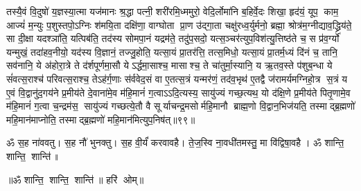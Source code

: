 तस्यै॒वं  वि॒दुषो॑ य॒ज्ञस्या॒त्मा यज॑मानः श्र॒द्धा पत्नी॒ शरी॑रमि॒ध्ममुरो॒ वेदि॒र्लोमा॑नि ब॒\ar{}हिर्वे॒दः  शिखा॒ हृद॑यं॒ यूप॒ काम॒ आज्यं॑ म॒न्युः प॒शुस्तपो॒ऽग्निः  श॑मयि॒ता दक्षि॑णा॒ वाग्घोता प्रा॒ण उ॑द्गा॒ता चक्षु॑रध्व॒र्युर्मनो॒ ब्रह्मा॒ श्रोत्र॑म॒ग्नीद्याव॒द्ध्रिय॑ते॒ सा दी॒क्षा यदश्ञा॑ति॒ यत्पिब॑ति॒ तद॑स्य सोमपा॒नं यद्रम॑ते॒ तदु॑प॒सदो॒ यत्स॒ञ्चर॑त्युप॒विश॑त्यु॒त्तिष्ठ॑ते च॒ स प्र॑व॒र्ग्यो॑ यन्मुखं॒ तदा॑हव॒नीयो॒ यद॑स्य वि॒ज्ञानं॒ तज्जु॒होति॒ यत्सा॒यं प्रा॒तर॑त्ति॒ तत्स॒मिधो॒ यत्सा॒यं प्रा॒तर्म॒ध्यं दि॑नं च॒ तानि॒ सव॑नानि॒ ये अ॑होरा॒त्रे ते द॑र्\mbox{}शपूर्णमा॒सौ येऽर्द्धमा॒साश्च॒ मासाश्च॒ ते चा॑तुर्मा॒स्यानि॒ य ऋ॒तव॒स्ते प॑शुब॒न्धा ये सं॑वत्स॒राश्च॑ परिवत्स॒राश्च॒ तेऽह॑र्ग॒णाः स॑र्ववेद॒सं वा ए॒तत्स॒त्रं यन्मर॑णं॒ तद॑व॒भृथ॑ ए॒तद्वै ज॑रामर्यमग्निहो॒त्र स॒त्रं य ए॒वं  वि॒द्वानु॑द॒गय॑ने प्र॒मीय॑ते दे॒वाना॑मे॒व म॑हि॒मानं॑ ग॒त्वाऽऽदि॒त्यस्य॒ सायु॑ज्यं गच्छ॒त्यथ॒ यो द॑क्षि॒णे प्र॒मीय॑ते पितृ॒णामे॒व म॑हि॒मानं॑ ग॒त्वा च॒न्द्रम॑स॒ सायु॑ज्यं गच्छत्ये॒तौ वै सूर्याचन्द्र॒मसोर्महि॒मानौ ब्राह्म॒णो वि॒द्वान॒भिज॑यति॒ तस्माद्ब्र॒ह्मणो॑ महि॒मान॑माप्नोति॒ तस्माद्ब्र॒ह्मणो॑ महि॒मान॑मित्युप॒निष॑त्॥९९॥
\anuvakamend

ॐ स॒ह ना॑ववतु। स॒ह नौ॑ भुनक्तु। स॒ह वी॒र्यं॑ करवावहै। ते॒ज॒स्वि ना॒वधी॑तमस्तु॒ मा वि॑द्विषा॒वहै। ॐ शान्ति॒ शान्ति॒ शान्ति॑॥

\centerline{॥ॐ शान्ति॒ शान्ति॒ शान्ति॑॥ हरि॑ ओम्॥}

\closesection
\clearpage
